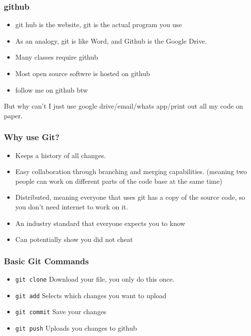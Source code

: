 \documentclass[aspectratio=169,hyperref={unicode}]{beamer}
\begin{document}
\begin{frame}
\frametitle{github}
\begin{itemize}
  \item git hub is the website, git is the actual program you use
        \item As an analogy, git is like Word, and Github is the Google Drive.
        \item Many classes require github
        \item Most open source softwre is hosted on github
        \item follow me on github btw
\end{itemize}
\end{frame}

\begin{frame}
But why can't I just use google drive/email/whats app/print out all my code on paper.
\end{frame}

\begin{frame}
\frametitle{Why use Git?}
\begin{itemize}
\item Keeps a history of all changes.
\item Easy collaboration through branching and merging capabilities. (meaning two people can work on different parts of the code base at the same time)
\item Distributed, meaning everyone that uses git has a copy of the source code, so you don't need internet to work on it.
        \item An industry standard that everyone expects you to know
        \item Can potentially show you did not cheat
\end{itemize}
\end{frame}

\begin{frame}
\frametitle{Basic Git Commands}
\begin{itemize}
  \item \texttt{git clone} Download your file, you only do this once.
  \item \texttt{git add} Selects which changes you want to upload
\item \texttt{git commit} Save your changes
\item \texttt{git push} Uploads you changes to github
\end{itemize}
\end{frame}
\end{document}

